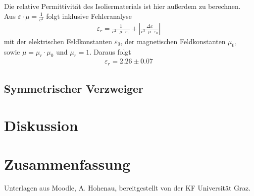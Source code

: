 \documentclass{article}
\begin{document}
Die relative Permittivität des Isoliermaterials ist hier außerdem zu berechnen. Aus $\varepsilon \cdot \mu = \frac{1}{c^2}$ folgt inklusive Fehleranalyse
\begin{align*}
\varepsilon_r = \frac{1}{c^2\cdot \mu\cdot \varepsilon_0} \pm \left| \frac{\Delta c}{c^3\cdot \mu\cdot \varepsilon_0} \right|
\end{align*}
mit der elektrischen Feldkonstanten $\varepsilon_0$, der magnetischen Feldkonstanten $\mu_0$, sowie $\mu = \mu_r\cdot\mu_0$ und $\mu_r=1$. Daraus folgt
\begin{align*}
\varepsilon_r = 2.26 \pm 0.07
\end{align*}


\subsection{Symmetrischer Verzweiger}




\section{Diskussion}






\section{Zusammenfassung}








%

%


%


\begin{thebibliography}{9}
 Unterlagen aus Moodle, A. Hohenau, bereitgestellt von der KF Universität Graz.
\end{thebibliography}
\end{document}
